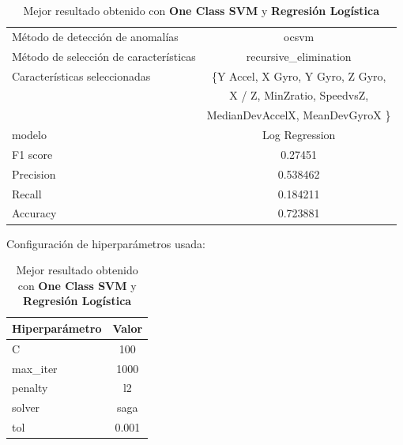 \begin{appendices}
		\begin{table}[htb]
			\centering
			\caption{Mejor resultado obtenido con \textbf{One Class SVM} y \textbf{Regresión Logística}}
			\label{table:32}
			\begin{tabular}{lc}
				\toprule
				\midrule
					  Método de detección de anomalías &                                              ocsvm \\
				Método de selección de características &                              recursive\_elimination \\
						 Características seleccionadas & \{Y Accel, X Gyro, Y Gyro, Z Gyro, \\ 
						 							   &  X / Z,  MinZratio, SpeedvsZ, \\
													   &  MedianDevAccelX, MeanDevGyroX \} \\
												modelo &                                     Log Regression \\
											  F1 score &                                            0.27451 \\
											 Precision &                                           0.538462 \\
												Recall &                                           0.184211 \\
											  Accuracy &                                           0.723881 \\
				\bottomrule
				\end{tabular}
			\newline
			\newline
			Configuración de hiperparámetros usada:
			\begin{tabular}{lc}
				\toprule
				Hiperparámetro &  Valor \\
				\midrule
							 C &    100 \\
					  max\_iter &   1000 \\
					   penalty &     l2 \\
						solver &   saga \\
						   tol &  0.001 \\
				\bottomrule
				\end{tabular}
			

\end{table}
\end{appendices}
